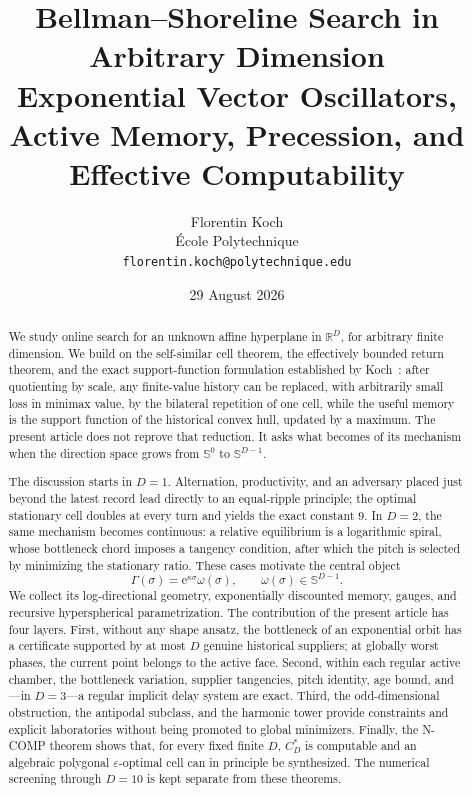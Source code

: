 \documentclass[10pt,a4paper]{article}
\title{\textbf{Bellman--Shoreline Search in Arbitrary Dimension}\\[0.35em]
\large Exponential Vector Oscillators, Active Memory, Precession, and Effective Computability}
\author{Florentin Koch\\
\small École Polytechnique\\
\small \texttt{florentin.koch@polytechnique.edu}}
\date{29 August 2026}
\newcommand{\R}{\mathbb{R}}
\newcommand{\Sph}{\mathbb{S}}
\newcommand{\e}{\mathrm{e}}
\newcommand{\cstar}{C^{*}}
\theoremstyle{plain}
\theoremstyle{definition}
\theoremstyle{remark}
\begin{document}
\maketitle


\begin{abstract}
We study online search for an unknown affine hyperplane in $\R^D$, for arbitrary finite dimension. We build on the self-similar cell theorem, the effectively bounded return theorem, and the exact support-function formulation established by Koch~\cite{koch-cell}: after quotienting by scale, any finite-value history can be replaced, with arbitrarily small loss in minimax value, by the bilateral repetition of one cell, while the useful memory is the support function of the historical convex hull, updated by a maximum. The present article does not reprove that reduction. It asks what becomes of its mechanism when the direction space grows from $\Sph^0$ to $\Sph^{D-1}$.

The discussion starts in $D=1$. Alternation, productivity, and an adversary placed just beyond the latest record lead directly to an equal-ripple principle; the optimal stationary cell doubles at every turn and yields the exact constant $9$. In $D=2$, the same mechanism becomes continuous: a relative equilibrium is a logarithmic spiral, whose bottleneck chord imposes a tangency condition, after which the pitch is selected by minimizing the stationary ratio. These cases motivate the central object
\[
  \Gamma(\sigma)=\e^{\kappa\sigma}\omega(\sigma),
  \qquad \omega(\sigma)\in\Sph^{D-1}.
\]
We collect its log-directional geometry, exponentially discounted memory, gauges, and recursive hyperspherical parametrization. The contribution of the present article has four layers. First, without any shape ansatz, the bottleneck of an exponential orbit has a certificate supported by at most $D$ genuine historical suppliers; at globally worst phases, the current point belongs to the active face. Second, within each regular active chamber, the bottleneck variation, supplier tangencies, pitch identity, age bound, and---in $D=3$---a regular implicit delay system are exact. Third, the odd-dimensional obstruction, the antipodal subclass, and the harmonic tower provide constraints and explicit laboratories without being promoted to global minimizers. Finally, the N-COMP theorem shows that, for every fixed finite $D$, $\cstar_D$ is computable and an algebraic polygonal $\varepsilon$-optimal cell can in principle be synthesized. The numerical screening through $D=10$ is kept separate from these theorems.
\end{abstract}
\end{document}
